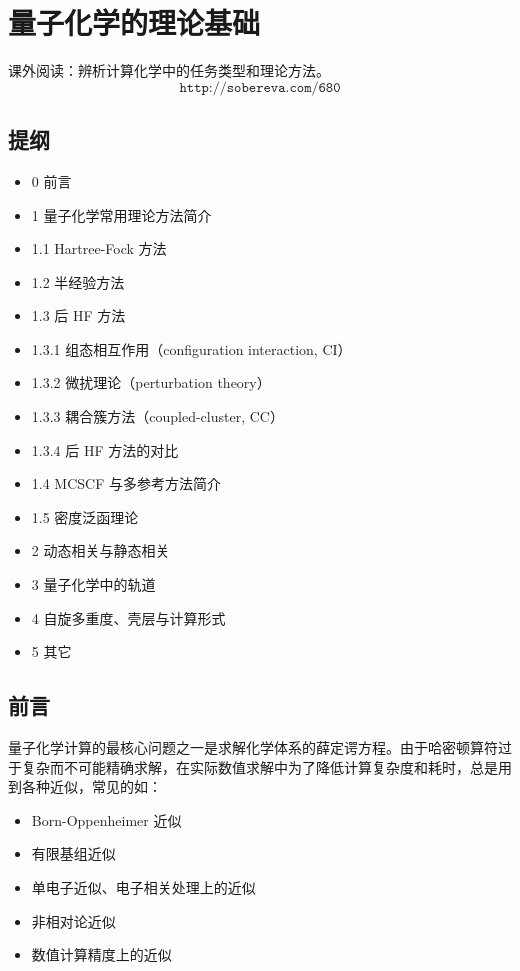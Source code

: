 \section{量子化学的理论基础}

课外阅读：辨析计算化学中的任务类型和理论方法。
\[
\texttt{http://sobereva.com/680}
\]

\subsection*{提纲}

\begin{itemize}
  \item 0 前言
  \item 1 量子化学常用理论方法简介
  \item 1.1 Hartree-Fock 方法
  \item 1.2 半经验方法
  \item 1.3 后 HF 方法
  \item 1.3.1 组态相互作用（configuration interaction, CI）
  \item 1.3.2 微扰理论（perturbation theory）
  \item 1.3.3 耦合簇方法（coupled-cluster, CC）
  \item 1.3.4 后 HF 方法的对比
  \item 1.4 MCSCF 与多参考方法简介
  \item 1.5 密度泛函理论
  \item 2 动态相关与静态相关
  \item 3 量子化学中的轨道
  \item 4 自旋多重度、壳层与计算形式
  \item 5 其它
\end{itemize}

\subsection*{前言}

量子化学计算的最核心问题之一是求解化学体系的薛定谔方程。由于哈密顿算符过于复杂而不可能精确求解，在实际数值求解中为了降低计算复杂度和耗时，总是用到各种近似，常见的如：

\begin{itemize}
  \item Born-Oppenheimer 近似
  \item 有限基组近似
  \item 单电子近似、电子相关处理上的近似
  \item 非相对论近似
  \item 数值计算精度上的近似
\end{itemize}

